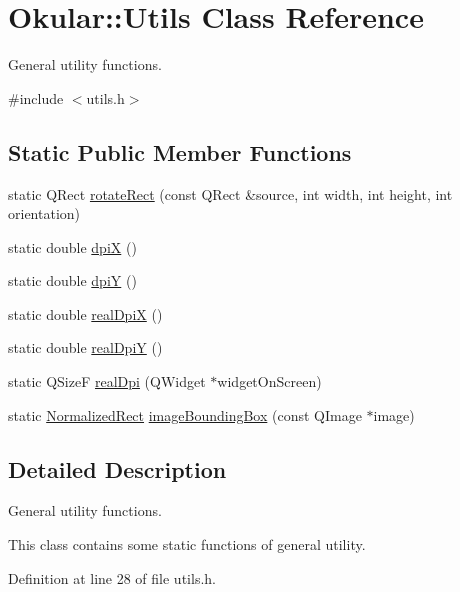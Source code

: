 \hypertarget{classOkular_1_1Utils}{\section{Okular\+:\+:Utils Class Reference}
\label{classOkular_1_1Utils}
}


General utility functions.  




{\ttfamily \#include $<$utils.\+h$>$}

\subsection*{Static Public Member Functions}
\begin{DoxyCompactItemize}
\item 
static Q\+Rect \hyperlink{classOkular_1_1Utils_a3c9f04ef5d3db4fe55c05aee593ac026}{rotate\+Rect} (const Q\+Rect \&source, int width, int height, int orientation)
\item 
static double \hyperlink{classOkular_1_1Utils_acd9a3685415399561c6cde450ead4710}{dpi\+X} ()
\item 
static double \hyperlink{classOkular_1_1Utils_aeee309843e66a38840d6cec2002df3ea}{dpi\+Y} ()
\item 
static double \hyperlink{classOkular_1_1Utils_a63b8636c3289528b1e5922b08ee55661}{real\+Dpi\+X} ()
\item 
static double \hyperlink{classOkular_1_1Utils_ab04cf7a89a0de943cddc5fa5b9389cd2}{real\+Dpi\+Y} ()
\item 
static Q\+Size\+F \hyperlink{classOkular_1_1Utils_a503c8cbc3fa6623139daa4abd5dfe52a}{real\+Dpi} (Q\+Widget $\ast$widget\+On\+Screen)
\item 
static \hyperlink{classOkular_1_1NormalizedRect}{Normalized\+Rect} \hyperlink{classOkular_1_1Utils_af1d97967ffcdda70bbc4ddb293da5020}{image\+Bounding\+Box} (const Q\+Image $\ast$image)
\end{DoxyCompactItemize}


\subsection{Detailed Description}
General utility functions. 

This class contains some static functions of general utility. 

Definition at line 28 of file utils.\+h.




